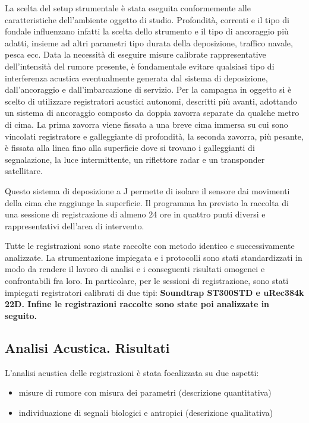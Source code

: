 La scelta del setup strumentale è stata eseguita conformemente alle caratteristiche dell'ambiente oggetto di studio. 
Profondità, correnti e il tipo di fondale influenzano infatti la scelta dello strumento e il tipo di ancoraggio più adatti, insieme ad altri parametri tipo durata della deposizione, traffico navale, pesca ecc. 
Data la necessità di eseguire misure calibrate rappresentative dell'intensità del rumore presente, è fondamentale evitare qualsiasi tipo di interferenza acustica eventualmente generata dal sistema di deposizione, dall’ancoraggio e dall’imbarcazione di servizio. 
Per la campagna in oggetto si è scelto di utilizzare registratori acustici autonomi, descritti più avanti, adottando un sistema di ancoraggio composto da doppia zavorra separate da qualche metro di cima. 
La prima zavorra viene fissata a una breve cima immersa su cui sono vincolati registratore e galleggiante di profondità, la seconda zavorra, più pesante, è fissata alla linea fino alla superficie dove si trovano i galleggianti di segnalazione, la luce intermittente, un riflettore radar e un transponder satellitare. 

Questo sistema di deposizione a J permette di isolare il sensore dai movimenti della cima che raggiunge la superficie.
Il programma ha previsto la raccolta di una sessione di registrazione di almeno 24 ore in quattro punti diversi e rappresentativi dell’area di intervento. 

Tutte le registrazioni sono state raccolte con metodo identico e successivamente analizzate. 
La strumentazione impiegata e i protocolli sono stati standardizzati in modo da rendere il lavoro di analisi e i conseguenti risultati omogenei e confrontabili fra loro.
In particolare, per le sessioni di registrazione, sono stati impiegati registratori calibrati di due tipi: \bfseries Soundtrap ST300STD e uRec384k 22D.
Infine le registrazioni raccolte sono state poi analizzate in seguito. 

\subsection{Analisi Acustica. Risultati}
L’analisi acustica delle registrazioni è stata focalizzata su due aspetti:

\begin{itemize}
\item misure di rumore con misura dei parametri (descrizione quantitativa) 
\item individuazione di segnali biologici e antropici (descrizione qualitativa)
\end{itemize} 

